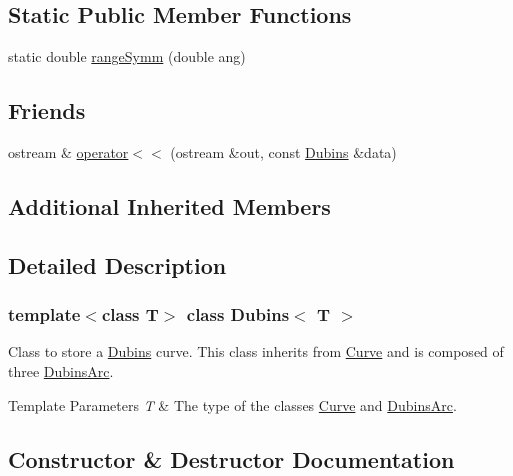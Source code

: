 \subsection*{Static Public Member Functions}
\begin{DoxyCompactItemize}
\item 
static double \mbox{\hyperlink{class_dubins_a1f80a03865231b60841bc8ec7623c04f}{range\+Symm}} (double ang)
\end{DoxyCompactItemize}
\subsection*{Friends}
\begin{DoxyCompactItemize}
\item 
ostream \& \mbox{\hyperlink{class_dubins_a0178baccb8eb26af22a5eb717f394c8c}{operator$<$$<$}} (ostream \&out, const \mbox{\hyperlink{class_dubins}{Dubins}} \&data)
\end{DoxyCompactItemize}
\subsection*{Additional Inherited Members}


\subsection{Detailed Description}
\subsubsection*{template$<$class T$>$\newline
class Dubins$<$ T $>$}

Class to store a \mbox{\hyperlink{class_dubins}{Dubins}} curve. This class inherits from {\ttfamily \mbox{\hyperlink{class_curve}{Curve}}} and is composed of three {\ttfamily \mbox{\hyperlink{class_dubins_arc}{Dubins\+Arc}}}. 


\begin{DoxyTemplParams}{Template Parameters}
{\em T} & The type of the classes {\ttfamily \mbox{\hyperlink{class_curve}{Curve}}} and {\ttfamily \mbox{\hyperlink{class_dubins_arc}{Dubins\+Arc}}}. \\
\hline
\end{DoxyTemplParams}


\subsection{Constructor \& Destructor Documentation}
\mbox{\label{class_dubins_acc45a9db5f20150b58d4fc36ad1548fa}} 
